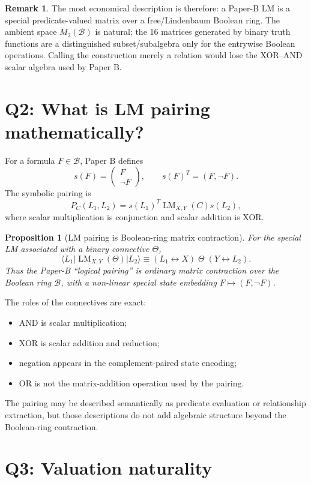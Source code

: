 \documentclass[11pt]{article}
\newtheorem{proposition}[theorem]{Proposition}
\theoremstyle{definition}
\newtheorem{remark}[theorem]{Remark}
\newcommand{\B}{\mathcal{B}}
\newcommand{\LM}{\operatorname{LM}}
\begin{document}
\begin{remark}
The most economical description is therefore: a Paper-B LM is a special predicate-valued matrix
over a free/Lindenbaum Boolean ring. The ambient space \(M_2(\B)\) is natural; the 16 matrices
generated by binary truth functions are a distinguished subset/subalgebra only for the entrywise
Boolean operations. Calling the construction merely a relation would lose the XOR--AND scalar
algebra used by Paper B.
\end{remark}

\section{Q2: What is LM pairing mathematically?}

For a formula \(F\in\B\), Paper B defines
\[
s(F)=
\begin{pmatrix}F\\ \neg F\end{pmatrix},
\qquad
s(F)^T=(F,\neg F).
\]
The symbolic pairing is
\[
P_C(L_1,L_2)
=
s(L_1)^T\LM_{X,Y}(C)s(L_2),
\]
where scalar multiplication is conjunction and scalar addition is XOR.

\begin{proposition}[LM pairing is Boolean-ring matrix contraction]
For the special LM associated with a binary connective \(\Theta\),
\[
\langle L_1\vert\LM_{X,Y}(\Theta)\vert L_2\rangle
\equiv
(L_1\leftrightarrow X)\;\Theta\;(Y\leftrightarrow L_2).
\]
Thus the Paper-B ``logical pairing'' is ordinary matrix contraction over the Boolean ring \(\B\),
with a non-linear special state embedding \(F\mapsto(F,\neg F)\).
\end{proposition}

The roles of the connectives are exact:
\begin{itemize}
\item AND is scalar multiplication;
\item XOR is scalar addition and reduction;
\item negation appears in the complement-paired state encoding;
\item OR is not the matrix-addition operation used by the pairing.
\end{itemize}

The pairing may be described semantically as predicate evaluation or relationship extraction, but
those descriptions do not add algebraic structure beyond the Boolean-ring contraction.

\section{Q3: Valuation naturality}
\end{document}
